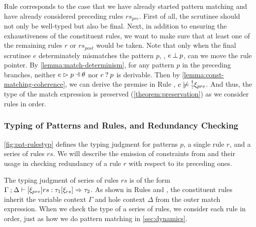Rule \TMatchNZPre corresponds to the case that we have already started pattern
matching and have already considered preceding rules $rs_{pre}$. First of all,
the scrutinee should not only be well-typed but also be final. Next, in addition to
ensuring the exhaustiveness of the constituent rules, we want to make sure that
at least one of the remaining rules $r$ or $rs_{post}$ would be taken. Note
that only when the final scrutinee $e$ determinately mismatches the pattern $p$, \ie,
$e \mathbin{\bot} p$, can we move the rule pointer. By
\autoref{lemma:match-determinism}, for any pattern $p$ in the preceding
branches, neither $\hpatmatch{e}{p}{\theta}$ nor $e \mathbin{?} p$ is derivable.
Then by \autoref{lemma:const-matching-coherence}, we can derive the premise
in Rule \TMatchNZPre, $\cnotsatisfyormay{e}{\xi_{pre}}$. And thus, the type of
the match expression is preserved (\autoref{theorem:preservation}) as we consider rules in order.

\subsubsection{Typing of Patterns and Rules, and Redundancy Checking}
\label{sec:pattyp}



\autoref{fig:pat-rulestyp} defines the typing judgment for patterns $p$, a
single rule $r$, and a series of rules $rs$. We will describe the emission of constraints from and their usage in checking redundancy of a rule $r$ with respect
to its preceding ones.

The typing judgment of series of rules $rs$ is of the form
$\Gamma \mathbin{;} \Delta \vdash [\xi_{pre}] rs : \tau_1 [\xi_{rs}] \Rightarrow \tau_2$. As shown
in Rules \TMatchZPre and \TMatchNZPre, the constituent rules inherit the
variable context $\Gamma$ and hole context $\Delta$ from the outer match
expression. When we check the type of a series of rules, we consider each rule
in order, just as how we do pattern matching in \autoref{sec:dynamics}.

